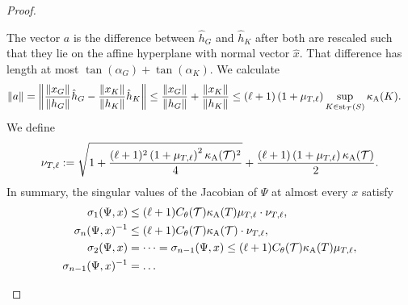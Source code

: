 \documentclass[10pt,a4paper]{article}
\begin{document}
\begin{proof}
\begin{itemize}
        The vector $a$ is the difference between $\hat h_{G}$ and $\hat h_{K}$ after both are rescaled such that they lie on the affine hyperplane with normal vector $\hat x$. That difference has length at most $\tan(\alpha_{G}) + \tan(\alpha_{K})$.
        We calculate 
        \begin{align*}
            \vecnorm{a}
            = 
            \left\|
            \frac{\vecnorm{ x_{G} }}{\vecnorm{ h_{G} }} \hat h_{{G}} 
            - 
            \frac{\vecnorm{ x_{K} }}{\vecnorm{ h_{K} }} \hat h_K
            \right\|
            &
            \leq 
            \frac{\vecnorm{ x_{G} }}{\vecnorm{ h_{G} }} 
            + 
            \frac{\vecnorm{ x_{K} }}{\vecnorm{ h_{K} }} 
            \leq 
            (\ell+1) 
            \left( 1 + \mu_{T,\ell} \right)
            \sup_{ K \in \patch_{\calT}(S) }
            \aspectratio(K) %
            .
        \end{align*}
        We define 
        \begin{align}
            \nu_{T,\ell} := \sqrt{ 1 + \frac{ (\ell+1)^{2}\left( 1 + \mu_{T,\ell} \right)^{2} \kappa_{\rm A}({\mathcal T})^{2} }{4} } + \frac{ (\ell+1)\left( 1 + \mu_{T,\ell} \right) \kappa_{\rm A}({\mathcal T}) }{2}
            .
        \end{align}
        In summary, 
        the singular values of the Jacobian of $\Psi$ at almost every $x$ satisfy 
        \begin{align}
            \sigma_{1}(\Psi,x) %
            &\leq  
            (\ell+1)
            \diameterratio(\calT)
            \aspectratio(T)\mu_{T,\ell} %
            \cdot 
            \nu_{T,\ell}
            ,
            \\
            \sigma_{n}(\Psi,x)^{-1} %
            &\leq  
            (\ell+1)
            \diameterratio(\calT)
            \aspectratio(\calT) 
            \cdot 
            \nu_{T,\ell}
            ,
            \\
            \sigma_{  2}(\Psi,x) 
            &= 
            \dots
            =
            \sigma_{n-1}(\Psi,x) 
            \leq 
            (\ell+1) \diameterratio(\calT) \aspectratio(T)\mu_{T,\ell}
            ,
            \\
            \sigma_{n-1}(\Psi,x)^{-1} 
            &= 
            \dots

\end{align}
\end{itemize}
\end{proof}
\end{document}
